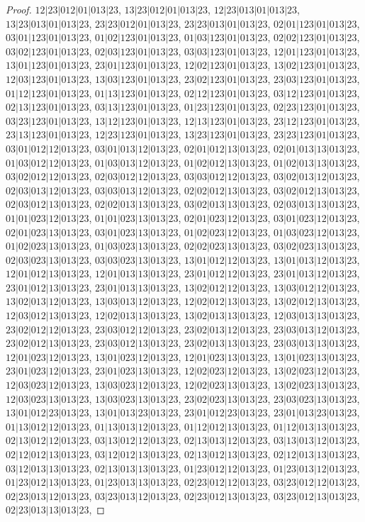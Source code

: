 \documentclass[12pt]{article}
\theoremstyle{plain}
\theoremstyle{definition}
\theoremstyle{remark}
\begin{document}
\begin{proof}
$12|23|012|01|013|23$, $13|23|012|01|013|23$, $12|23|013|01|013|23$, $13|23|013|01|013|23$, $23|23|012|01|013|23$, $23|23|013|01|013|23$, $02|01|123|01|013|23$, $03|01|123|01|013|23$, $01|02|123|01|013|23$, $01|03|123|01|013|23$, $02|02|123|01|013|23$, $03|02|123|01|013|23$, $02|03|123|01|013|23$, $03|03|123|01|013|23$, $12|01|123|01|013|23$, $13|01|123|01|013|23$, $23|01|123|01|013|23$, $12|02|123|01|013|23$, $13|02|123|01|013|23$, $12|03|123|01|013|23$, $13|03|123|01|013|23$, $23|02|123|01|013|23$, $23|03|123|01|013|23$, $01|12|123|01|013|23$, $01|13|123|01|013|23$, $02|12|123|01|013|23$, $03|12|123|01|013|23$, $02|13|123|01|013|23$, $03|13|123|01|013|23$, $01|23|123|01|013|23$, $02|23|123|01|013|23$, $03|23|123|01|013|23$, $13|12|123|01|013|23$, $12|13|123|01|013|23$, $23|12|123|01|013|23$, $23|13|123|01|013|23$, $12|23|123|01|013|23$, $13|23|123|01|013|23$, $23|23|123|01|013|23$, $03|01|012|12|013|23$, $03|01|013|12|013|23$, $02|01|012|13|013|23$, $02|01|013|13|013|23$, $01|03|012|12|013|23$, $01|03|013|12|013|23$, $01|02|012|13|013|23$, $01|02|013|13|013|23$, $03|02|012|12|013|23$, $02|03|012|12|013|23$, $03|03|012|12|013|23$, $03|02|013|12|013|23$, $02|03|013|12|013|23$, $03|03|013|12|013|23$, $02|02|012|13|013|23$, $03|02|012|13|013|23$, $02|03|012|13|013|23$, $02|02|013|13|013|23$, $03|02|013|13|013|23$, $02|03|013|13|013|23$, $01|01|023|12|013|23$, $01|01|023|13|013|23$, $02|01|023|12|013|23$, $03|01|023|12|013|23$, $02|01|023|13|013|23$, $03|01|023|13|013|23$, $01|02|023|12|013|23$, $01|03|023|12|013|23$, $01|02|023|13|013|23$, $01|03|023|13|013|23$, $02|02|023|13|013|23$, $03|02|023|13|013|23$, $02|03|023|13|013|23$, $03|03|023|13|013|23$, $13|01|012|12|013|23$, $13|01|013|12|013|23$, $12|01|012|13|013|23$, $12|01|013|13|013|23$, $23|01|012|12|013|23$, $23|01|013|12|013|23$, $23|01|012|13|013|23$, $23|01|013|13|013|23$, $13|02|012|12|013|23$, $13|03|012|12|013|23$, $13|02|013|12|013|23$, $13|03|013|12|013|23$, $12|02|012|13|013|23$, $13|02|012|13|013|23$, $12|03|012|13|013|23$, $12|02|013|13|013|23$, $13|02|013|13|013|23$, $12|03|013|13|013|23$, $23|02|012|12|013|23$, $23|03|012|12|013|23$, $23|02|013|12|013|23$, $23|03|013|12|013|23$, $23|02|012|13|013|23$, $23|03|012|13|013|23$, $23|02|013|13|013|23$, $23|03|013|13|013|23$, $12|01|023|12|013|23$, $13|01|023|12|013|23$, $12|01|023|13|013|23$, $13|01|023|13|013|23$, $23|01|023|12|013|23$, $23|01|023|13|013|23$, $12|02|023|12|013|23$, $13|02|023|12|013|23$, $12|03|023|12|013|23$, $13|03|023|12|013|23$, $12|02|023|13|013|23$, $13|02|023|13|013|23$, $12|03|023|13|013|23$, $13|03|023|13|013|23$, $23|02|023|13|013|23$, $23|03|023|13|013|23$, $13|01|012|23|013|23$, $13|01|013|23|013|23$, $23|01|012|23|013|23$, $23|01|013|23|013|23$, $01|13|012|12|013|23$, $01|13|013|12|013|23$, $01|12|012|13|013|23$, $01|12|013|13|013|23$, $02|13|012|12|013|23$, $03|13|012|12|013|23$, $02|13|013|12|013|23$, $03|13|013|12|013|23$, $02|12|012|13|013|23$, $03|12|012|13|013|23$, $02|13|012|13|013|23$, $02|12|013|13|013|23$, $03|12|013|13|013|23$, $02|13|013|13|013|23$, $01|23|012|12|013|23$, $01|23|013|12|013|23$, $01|23|012|13|013|23$, $01|23|013|13|013|23$, $02|23|012|12|013|23$, $03|23|012|12|013|23$, $02|23|013|12|013|23$, $03|23|013|12|013|23$, $02|23|012|13|013|23$, $03|23|012|13|013|23$, $02|23|013|13|013|23$, 
\end{proof}
\end{document}
